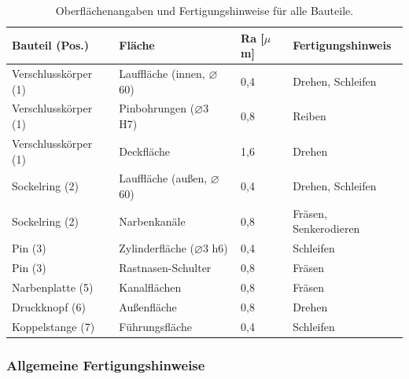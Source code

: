﻿\documentclass[12pt, a4paper]{article}
\theoremstyle{remark}
\begin{document}
\begin{table}[H]
  \centering
  \caption{Oberflächenangaben und Fertigungshinweise für alle Bauteile.}
  \label{tab:oberflaechen}
  \renewcommand{\arraystretch}{1.35}
  \begin{tabular}{llll}
    \toprule
    \textbf{Bauteil (Pos.)} & \textbf{Fläche} & \textbf{Ra [$\mu$m]} & \textbf{Fertigungshinweis} \\
    \midrule
    Verschlusskörper (1)  & Lauffläche (innen, $\varnothing$60)  & 0{,}4 & Drehen, Schleifen \\
    Verschlusskörper (1)  & Pinbohrungen ($\varnothing$3 H7)     & 0{,}8 & Reiben \\
    Verschlusskörper (1)  & Deckfläche                           & 1{,}6 & Drehen \\
    Sockelring (2)        & Lauffläche (außen, $\varnothing$60)  & 0{,}4 & Drehen, Schleifen \\
    Sockelring (2)        & Narbenkanäle                         & 0{,}8 & Fräsen, Senkerodieren \\
    Pin (3)               & Zylinderfläche ($\varnothing$3 h6)   & 0{,}4 & Schleifen \\
    Pin (3)               & Rastnasen-Schulter                   & 0{,}8 & Fräsen \\
    Narbenplatte (5)      & Kanalflächen                         & 0{,}8 & Fräsen \\
    Druckknopf (6)        & Außenfläche                          & 0{,}8 & Drehen \\
    Koppelstange (7)      & Führungsfläche                       & 0{,}4 & Schleifen \\
    \bottomrule
  \end{tabular}
\end{table}

\subsubsection*{Allgemeine Fertigungshinweise}
\end{document}

